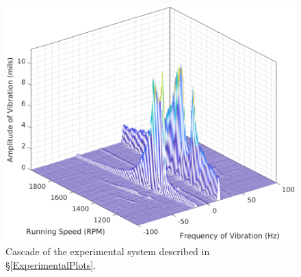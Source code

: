 \begin{figure}
	\centering
	\includegraphics[width=\linewidth]{./figures/ExpExampleCascade.pdf}
	\caption{Cascade of the experimental system described in \S\ref{ExperimentalPlots}.}
	\label{fig:ExpExampleCascade}
\end{figure}
